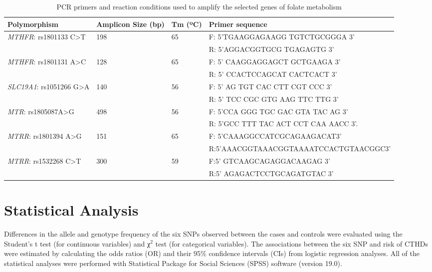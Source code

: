 \begin{refsection}
\begin{landscape}
\begin{table}[!tb]
\centering
\caption{PCR primers and reaction conditions used to amplify the selected genes of folate metabolism \cite{deeparani2009detection,shaw2003genetic,galbiatti20105,zeng2011a66g}}
\label{tab:6_1}
\begin{tabular}{  l P{1in} P{0.75in} p{4.3in}  }
\toprule
	\textbf{Polymorphism} & \textbf{Amplicon Size (bp)} & \textbf{Tm (ºC)} & \textbf{Primer sequence} \\ \toprule
	\textit{MTHFR}: rs1801133 C>T & 198 & 65 & F: 5’TGAAGGAGAAGG TGTCTGCGGGA 3’ \\ 
	 &  &  & R: 5’AGGACGGTGCG TGAGAGTG 3’ \\ \midrule
	\textit{MTHFR}: rs1801131 A>C & 128 & 65 & F: 5' CAAGGAGGAGCT  GCTGAAGA 3’ \\ 
	 &  &  & R: 5' CCACTCCAGCAT CACTCACT 3’ \\ \midrule
	\textit{SLC19A1}:  rs1051266  G>A & 140 & 56 & F: 5' AG TGT CAC CTT CGT CCC 3' \\ 
	 &  &  & R: 5' TCC CGC GTG AAG TTC TTG 3' \\ \midrule
	\textit{MTR}: rs1805087A>G & 498 & 56 & F: 5’CCA GGG TGC GAC GTA TAC AG 3’ \\ 
	 &  &  & R: 5’GCC TTT TAC ACT CCT CAA AACC 3’. \\ \midrule
	\textit{MTRR}:  rs1801394 A>G & 151 & 65 & F: 5'CAAAGGCCATCGCAGAAGACAT3' \\ 
	 &  &  & R:5'AAACGGTAAACGGTAAAATCCACTGTAACGGC3' \\ \midrule
	\textit{MTRR}:  rs1532268 C>T & 300 & 59 & F:5' GTCAAGCAGAGGACAAGAG 3' \\ 
	 &  &  & R:5' AGAGACTCCTGCAGATGTAC 3' \\ \bottomrule
\end{tabular}
\end{table}
\end{landscape}

\section{Statistical Analysis}

Differences in the allele and genotype frequency of the six SNPs observed between the cases and controls were evaluated using the Student's t test (for continuous variables) and χ$^2$ test (for categorical variables). The associations between the six SNP and risk of CTHDs were estimated by calculating the odds ratios (OR) and their 95\% confidence intervals (CIs) from logistic regression analyses. All of the statistical analyses were performed with Statistical Package for Social Sciences (SPSS) software (version 19.0). 


\end{refsection}
